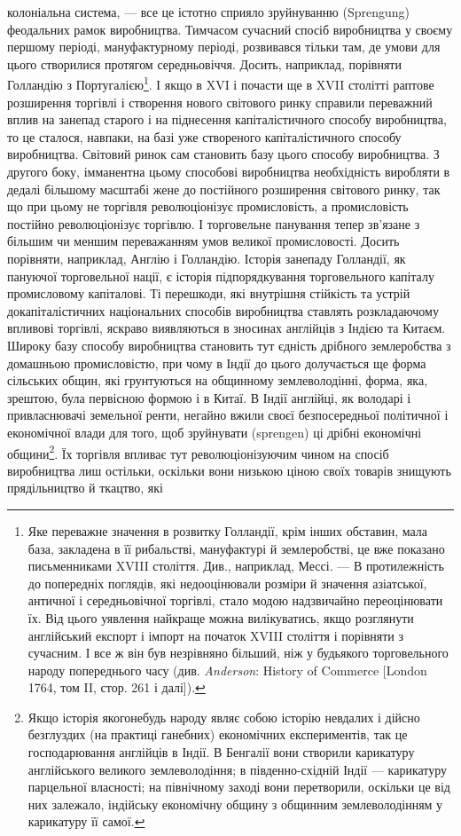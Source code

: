 \parcont{}  %
колоніальна система, — все це істотно сприяло зруйнуванню
(Sprengung) феодальних рамок виробництва. Тимчасом сучасний
спосіб виробництва у своєму першому періоді, мануфактурному
періоді, розвивався тільки там, де умови для цього створилися
протягом середньовіччя. Досить, наприклад, порівняти Голландію
з Португалією\footnote{
Яке переважне значення в розвитку Голландії, крім інших обставин,
мала база, закладена в її рибальстві, мануфактурі й землеробстві, це вже показано
письменниками XVIII століття. Див., наприклад, Мессі. — В протилежність
до попередніх поглядів, які недооцінювали розміри й значення азіатської, античної
і середньовічної торгівлі, стало модою надзвичайно переоцінювати їх.
Від цього уявлення найкраще можна вилікуватись, якщо розглянути англійський
експорт і імпорт на початок XVIII століття і порівняти з сучасним. І все ж
він був незрівняно більший, ніж у будьякого торговельного народу попереднього
часу (див. \emph{Anderson}: History of Commerce [London 1764, том II, стор. 261
і далі]).
}. І якщо в XVI і почасти ще в XVII столітті
раптове розширення торгівлі і створення нового світового ринку
справили переважний вплив на занепад старого і на піднесення
капіталістичного способу виробництва, то це сталося, навпаки,
на базі уже створеного капіталістичного способу виробництва.
Світовий ринок сам становить базу цього способу виробництва.
З другого боку, імманентна цьому способові виробництва необхідність
виробляти в дедалі більшому масштабі жене до постійного
розширення світового ринку, так що при цьому не торгівля
революціонізує промисловість, а промисловість постійно революціонізує
торгівлю. І торговельне панування тепер зв’язане
з більшим чи меншим переважанням умов великої промисловості.
Досить порівняти, наприклад, Англію і Голландію. Історія занепаду
Голландії, як пануючої торговельної нації, є історія підпорядкування
торговельного капіталу промисловому капіталові.
Ті перешкоди, які внутрішня стійкість та устрій докапіталістичних
національних способів виробництва ставлять розкладаючому
впливові торгівлі, яскраво виявляються в зносинах англійців
з Індією та Китаєм. Широку базу способу виробництва
становить тут єдність дрібного землеробства з домашньою промисловістю,
при чому в Індії до цього долучається ще форма
сільських общин, які грунтуються на общинному землеволодінні,
форма, яка, зрештою, була первісною формою і в Китаї.
В Індії англійці, як володарі і привласнювачі земельної ренти,
негайно вжили своєї безпосередньої політичної і економічної
влади для того, щоб зруйнувати (sprengen) ці дрібні економічні
общини\footnote{
Якщо історія якогонебудь народу являє собою історію невдалих і дійсно
безглуздих (на практиці ганебних) економічних експериментів, так це господарювання
англійців в Індії. В Бенгалії вони створили карикатуру англійського
великого землеволодіння; в південно-східній Індії — карикатуру парцельної
власності; на північному заході вони перетворили, оскільки це від них залежало,
індійську економічну общину з общинним землеволодінням у карикатуру її
самої.
}. Їх торгівля впливає тут революціонізуючим чином
на спосіб виробництва лиш остільки, оскільки вони низькою
ціною своїх товарів знищують прядільництво й ткацтво, які
\parbreak{}  %
